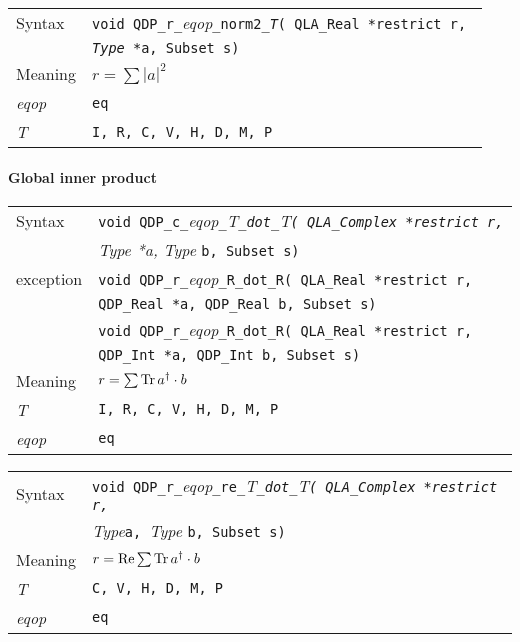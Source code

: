 \documentclass{article}
\renewcommand{\Re}{\mathop{\rm Re}}
\newcommand{\Tr}{\mathop{\rm Tr}}
\newcommand{\tReal}{QDP\ttdash Real }
\newcommand{\tInt}{QDP\ttdash Int }
\newcommand{\tqlaReal}{QLA\ttdash Real }
\newcommand{\tqlaComplex}{QLA\ttdash Complex }
\newcommand{\namespace}{QDP}
\newcommand{\allNumericTypes}{{\tt I, R, C, V, H, D, M, P}}
\newcommand{\ttdash}{{\tt \_}}
\newcommand{\itt}{\it T}
\newcommand{\extraarg}{, Subset s}
\newcommand{\protoUnarySingleTypesQual}[5]{{\tt void \namespace}\ttdash{\tt #1}\ttdash{\it eqop}\ttdash#2\ttdash{\tt #3}{\tt ( #4 *restrict r, }\\
  & {\tt #5 *a\extraarg)}}
\newcommand{\globalnormsqtypeconv}{}
\begin{document}
\begin{flushleft}
  \begin{tabular}{|l|l|}
  \hline
  Syntax      & \protoUnarySingleTypesQual{r}{\tt norm2}{\itt}{\tqlaReal}{{\it Type}} \\
  \hline
  Meaning     & $r = \sum |a|^2$ \\
  \hline
  {\it eqop}  & {\tt eq} \\
  \hline
  \itt        & \allNumericTypes \\
  \hline
  \end{tabular}
\end{flushleft}

\globalnormsqtypeconv

\paragraph{Global inner product}

\begin{flushleft}
  \begin{tabular}{|l|l|}
  \hline
  Syntax      & {\tt void \namespace}\ttdash{\tt c}\ttdash{\it eqop}\ttdash\itt\ttdash{\tt dot}\ttdash\itt{\tt ( \tqlaComplex *restrict r, }\\
              & {\it Type *a, }{\it Type }{\tt *b\extraarg)} \\
  exception   & {\tt void \namespace}\ttdash{\tt r}\ttdash{\it eqop}\ttdash{\tt R}\ttdash{\tt dot}\ttdash{\tt R}{\tt ( \tqlaReal *restrict r, }\\
              & {\tt \tReal *a, }{\tt \tReal }{\tt *b\extraarg)} \\
              & {\tt void \namespace}\ttdash{\tt r}\ttdash{\it eqop}\ttdash{\tt R}\ttdash{\tt dot}\ttdash{\tt R}{\tt ( \tqlaReal *restrict r, }\\
              & {\tt \tInt *a, }{\tt \tInt }{\tt *b\extraarg)} \\
  \hline
  Meaning     & $r = \sum \Tr a^\dagger \cdot b$ \\
  \hline
  \itt        & {\tt \allNumericTypes} \\
  \hline
  {\it eqop}  & {\tt eq} \\
  \hline
  \end{tabular}
\end{flushleft}


\begin{flushleft}
  \begin{tabular}{|l|l|}
  \hline
  Syntax      & {\tt void \namespace}\ttdash{\tt r}\ttdash{\it eqop}\ttdash{\tt re}\ttdash\itt\ttdash{\tt dot}\ttdash\itt{\tt ( \tqlaComplex *restrict r, }\\
              & {\it Type}{\tt *a, }{\it Type }{\tt *b\extraarg)} \\
  \hline
  Meaning     & $r = \Re \sum \Tr a^\dagger \cdot b$ \\
  \hline
  \itt        & {\tt C, V, H, D, M, P} \\
  \hline
  {\it eqop}  & {\tt eq} \\
  \hline
  \end{tabular}
\end{flushleft}
\end{document}
